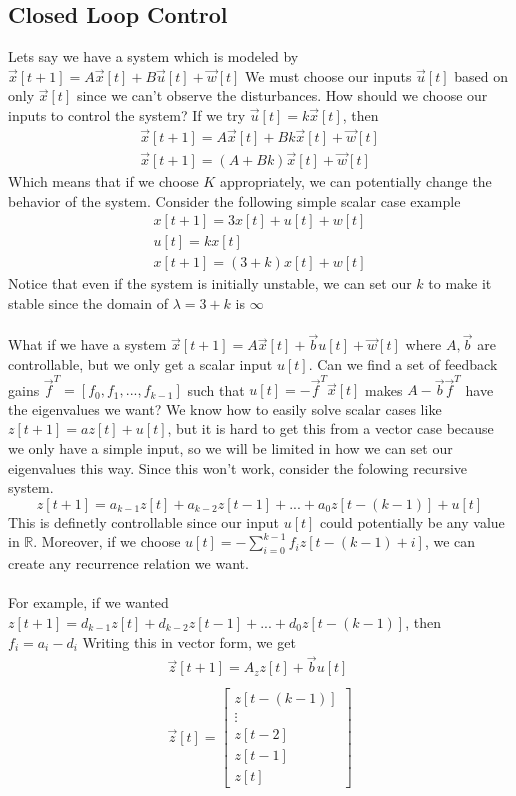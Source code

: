 \documentclass{article}
\begin{document}
\subsection{Closed Loop Control}
Lets say we have a system which is modeled by $\vec{x}[t+1]=A \vec{x}[t]+B\vec{u}[t]+\vec{w}[t]$
We must choose our inputs $\vec{u}[t]$ based on only $\vec{x}[t]$ since we can't observe the disturbances. How should we choose our inputs to control the system?
If we try $\vec{u}[t]=k\vec{x}[t]$, then
\[
    \begin{array}{c}
        \vec{x}[t+1]=A\vec{x}[t]+Bk\vec{x}[t]+\vec{w}[t]\\
        \vec{x}[t+1]=(A+Bk)\vec{x}[t]+\vec{w}[t]
    \end{array}
\]
Which means that if we choose $K$ appropriately, we can potentially change the behavior of the system.
Consider the following simple scalar case example
\[
    \begin{array}{c}
        x[t+1]=3x[t]+u[t]+w[t]\\
        u[t] = kx[t]\\
        x[t+1] = (3+k)x[t]+w[t]
    \end{array}
\]
Notice that even if the system is initially unstable, we can set our $k$ to make it stable since the domain of $\lambda=3+k$ is $\infty$
\\\\What if we have a system $\vec{x}[t+1]=A\vec{x}[t]+\vec{b}u[t]+\vec{w}[t]$ where $A, \vec{b}$ are controllable, but we only get a scalar input $u[t]$.
Can we find a set of feedback gains $\vec{f}^T=[f_0, f_1, ..., f_{k-1}]$ such that $u[t]=-\vec{f}^T\vec{x}[t]$ makes $A-\vec{b}\vec{f}^T$ have the eigenvalues we want?
\break \break
We know how to easily solve scalar cases like $z[t+1]=az[t]+u[t]$, but it is hard to get this from a vector case because we only have a simple input, so we will be limited in how we can set our eigenvalues this way.
Since this won't work, consider the folowing recursive system.
$$z[t+1]=a_{k-1}z[t]+a_{k-2}z[t-1]+...+a_0z[t-(k-1)]+u[t]$$
This is definetly controllable since our input $u[t]$ could potentially be any value in $\mathbb{R}$.
Moreover, if we choose $u[t]=-\sum_{i=0}^{k-1}{f_i z[t-(k-1)+i]}$, we can create any recurrence relation we want.
\\\\For example, if we wanted $z[t+1]=d_{k-1}z[t]+d_{k-2}z[t-1]+...+d_0z[t-(k-1)]$, then $f_i=a_i-d_i$
Writing this in vector form, we get
\[
    \begin{array}{c}
    \vec{z}[t+1]=A_z z[t]+\vec{b}u[t] \\
    \\
    \vec{z}[t] = \left[
        \begin{array}{c}
            z[t-(k-1)]\\
            \vdots\\
            z[t-2]\\
            z[t-1]\\
            z[t]
        \end{array}
    \right]
    \end{array}
\]
\end{document}
